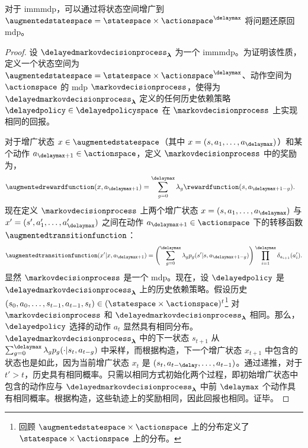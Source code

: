 \begin{prop}
\label{prop:equ_mdp_im_mtdmdp}
    对于 \gls{immmdp}，可以通过将状态空间增广到 $\augmentedstatespace=\statespace\times\actionspace^\delaymax$ 将问题还原回 \gls{mdp}。
\end{prop}
\begin{proof}
    设 $\delayedmarkovdecisionprocess_{\boldsymbol\lambda}$ 为一个 \gls{immmdp}。为证明该性质，定义一个状态空间为 $\augmentedstatespace=\statespace\times\actionspace^\delaymax$、动作空间为 $\actionspace$ 的 \gls{mdp} $\markovdecisionprocess$，使得为 $\delayedmarkovdecisionprocess_{\boldsymbol\lambda}$ 定义的任何历史依赖策略 $\delayedpolicy\in\delayedpolicyspace$ 在 $\markovdecisionprocess$ 上实现相同的回报。

    对于增广状态 $x\in\augmentedstatespace$（其中 $x=(s,a_1,\dots,a_{\delaymax})$）和某个动作 $a_{\delaymax+1}\in\actionspace$，定义 $\markovdecisionprocess$ 中的奖励为，
    \begin{align*}
        \augmentedrewardfunction(x,a_{\delaymax+1}) &=\sum_{g=0}^{\delaymax} \lambda_{g} \rewardfunction(s,a_{\delaymax+1-g}).
    \end{align*}
    现在定义 $\markovdecisionprocess$ 上两个增广状态 $x=(s,a_1,\dots,a_{\delaymax})$ 与 $x'=(s',a_1',\dots,a_{\delaymax}')$ 之间在动作 $a_{\delaymax+1}\in\actionspace$ 下的转移函数 $\augmentedtransitionfunction$：
    \begin{align*}
        \augmentedtransitionfunction(x'\vert x,a_{\delaymax+1}) = \left(\sum_{g=0}^{\delaymax}\lambda_g p_{g}(s'\vert s,a_{\delaymax+1-g})\right)\prod_{i=1}^{\delaymax}\delta_{a_{i+1}}(a_{i}').
    \end{align*}
    显然 $\markovdecisionprocess$ 是一个 \gls{mdp}。现在，设 $\delayedpolicy$ 是 $\delayedmarkovdecisionprocess_{\boldsymbol\lambda}$ 上的历史依赖策略。假设历史 $(s_0,a_0,\dots,s_{t-1},a_{t-1},s_t)\in(\statespace\times\actionspace)^t$\footnote{回顾 $\augmentedstatespace\times\actionspace$ 上的分布定义了 $\statespace\times\actionspace$ 上的分布。} 对 $\markovdecisionprocess$ 和 $\delayedmarkovdecisionprocess_{\boldsymbol\lambda}$ 相同。那么，$\delayedpolicy$ 选择的动作 $a_t$ 显然具有相同分布。$\delayedmarkovdecisionprocess_{\boldsymbol\lambda}$ 中的下一状态 $s_{t+1}$ 从 $\textstyle\sum_{g=0}^{\delaymax}\lambda_g p_g(\cdot\vert s_t,a_{t-g})$ 中采样，而根据构造，下一个增广状态 $x_{t+1}$ 中包含的状态也是如此，因为当前增广状态 $x_t$ 是 $(s_t,a_{t-\delay},\dots,a_{t-1})$。通过递推，对于 $t'>t$，历史具有相同概率。只需以相同方式初始化两个过程，即初始增广状态中包含的动作应与 $\delayedmarkovdecisionprocess_{\boldsymbol\lambda}$ 中前 $\delaymax$ 个动作具有相同概率。根据构造，这些轨迹上的奖励相同，因此回报也相同。证毕。
\end{proof}


